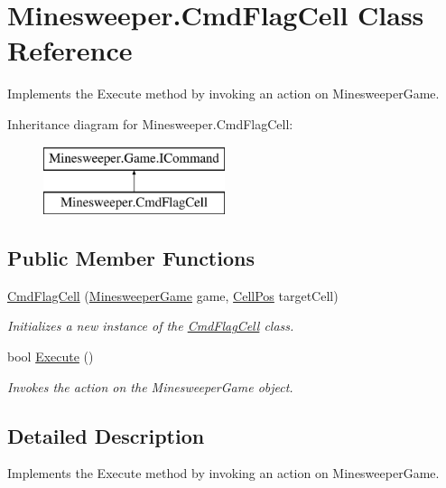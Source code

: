 \hypertarget{class_minesweeper_1_1_cmd_flag_cell}{\section{Minesweeper.\+Cmd\+Flag\+Cell Class Reference}
\label{class_minesweeper_1_1_cmd_flag_cell}
}


Implements the Execute method by invoking an action on Minesweeper\+Game.  


Inheritance diagram for Minesweeper.\+Cmd\+Flag\+Cell\+:\begin{figure}[H]
\begin{center}
\leavevmode
\includegraphics[height=2.000000cm]{class_minesweeper_1_1_cmd_flag_cell}
\end{center}
\end{figure}
\subsection*{Public Member Functions}
\begin{DoxyCompactItemize}
\item 
\hyperlink{class_minesweeper_1_1_cmd_flag_cell_af58abdbee18020bc801f51f5437701e4}{Cmd\+Flag\+Cell} (\hyperlink{class_minesweeper_1_1_game_1_1_minesweeper_game}{Minesweeper\+Game} game, \hyperlink{struct_minesweeper_1_1_lib_1_1_cell_pos}{Cell\+Pos} target\+Cell)
\begin{DoxyCompactList}\small\item\em Initializes a new instance of the \hyperlink{class_minesweeper_1_1_cmd_flag_cell}{Cmd\+Flag\+Cell} class. \end{DoxyCompactList}\item 
bool \hyperlink{class_minesweeper_1_1_cmd_flag_cell_ab8fdee19beed086308829c7d3ae9b7ef}{Execute} ()
\begin{DoxyCompactList}\small\item\em Invokes the action on the Minesweeper\+Game object. \end{DoxyCompactList}\end{DoxyCompactItemize}


\subsection{Detailed Description}
Implements the Execute method by invoking an action on Minesweeper\+Game. 




